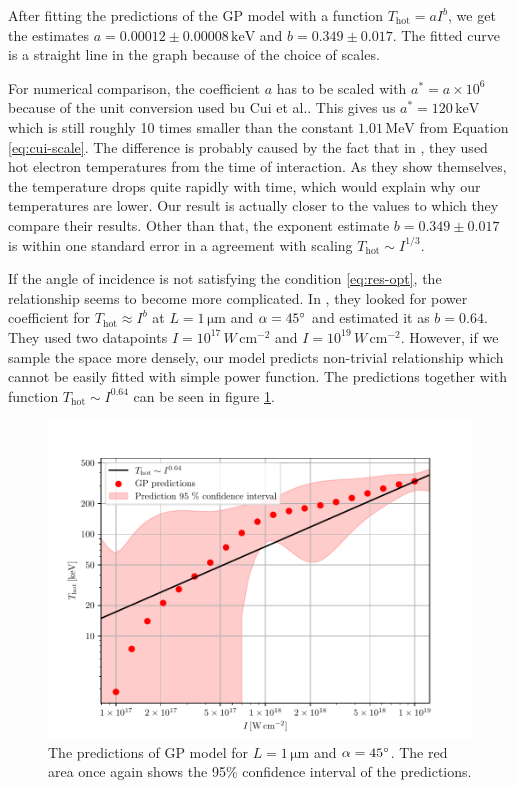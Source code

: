 After fitting the predictions of the GP model with a function $T_{\mathrm{hot}}= aI^b$, we get the estimates $a=0.00012\pm0.00008 \, \mathrm{keV}$ and $b=0.349\pm0.017$. The fitted curve is a straight line in the graph because of the choice of scales.

For numerical comparison, the coefficient $a$ has to be scaled with $a^* = a\times 10^6$ because of the unit conversion used bu Cui et al.. This gives us $a^* = 120 \, \mathrm{keV}$ which is still roughly 10 times smaller than the constant $1.01\, \mathrm{MeV}$ from Equation \ref{eq:cui-scale}. The difference is probably caused by the fact that in \cite{cui2013}, they used hot electron temperatures from the time of interaction. As they show themselves, the temperature drops quite rapidly with time, which would explain why our temperatures are lower. Our result is actually closer to the values to which they compare their results.
Other than that, the exponent estimate  $b=0.349\pm0.017$ is within one standard error in a agreement with scaling $T_\mathrm{hot} \sim I^{1/3}$.	



If the angle of incidence is not satisfying the condition \ref{eq:res-opt}, the relationship seems to become more complicated. In \cite{cui2013}, they looked for power coefficient for $T_\mathrm{hot} \approx I^{b}$ at $L = 1\,\mathrm{\mu m}$ and $\alpha = 45\degree$ and estimated it as $b=0.64$. They used two datapoints $I = 10^{17} \, W \, \mathrm{cm}^{-2}$ and $I = 10^{19} \, W \, \mathrm{cm}^{-2}$. However, if we sample the space more densely, our model predicts non-trivial relationship which cannot be easily fitted with simple power function. The predictions  together with function $T_\mathrm{hot} \sim I^{0.64}$ can be seen in figure \ref{fig:cui-compare-2}.

\begin{figure}[h]
	\centering
	\includegraphics[width=0.95 \textwidth]{figures/cui_compare2}
	\caption{The predictions of GP model for $L = 1 \, \mathrm{\mu m}$ and $\alpha = 45 \degree$. The red area once again shows the 95\% confidence interval of the predictions.}
	\label{fig:cui-compare-2}
\end{figure}



